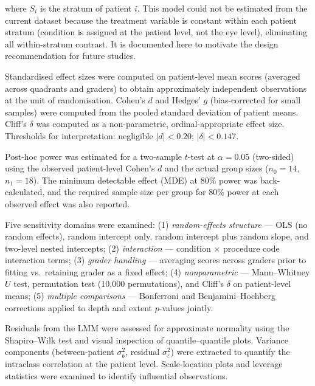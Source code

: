 \noindent where $S_i$ is the stratum of patient $i$. This model could not be estimated from the current dataset because the treatment variable is constant within each patient stratum (condition is assigned at the patient level, not the eye level), eliminating all within-stratum contrast. It is documented here to motivate the design recommendation for future studies.


Standardised effect sizes were computed on patient-level mean scores (averaged across quadrants and graders) to obtain approximately independent observations at the unit of randomisation. Cohen's $d$ and Hedges' $g$ (bias-corrected for small samples) were computed from the pooled standard deviation of patient means. Cliff's $\delta$ was computed as a non-parametric, ordinal-appropriate effect size. Thresholds for interpretation: negligible $|d| < 0.20$; $|\delta| < 0.147$.

Post-hoc power was estimated for a two-sample $t$-test at $\alpha = 0.05$ (two-sided) using the observed patient-level Cohen's $d$ and the actual group sizes ($n_0 = 14$, $n_1 = 18$). The minimum detectable effect (MDE) at 80\% power was back-calculated, and the required sample size per group for 80\% power at each observed effect was also reported.

Five sensitivity domains were examined: (1) \textit{random-effects structure} --- OLS (no random effects), random intercept only, random intercept plus random slope, and two-level nested intercepts; (2) \textit{interaction} --- condition $\times$ procedure code interaction terms; (3) \textit{grader handling} --- averaging scores across graders prior to fitting vs.\ retaining grader as a fixed effect; (4) \textit{nonparametric} --- Mann--Whitney $U$ test, permutation test (10{,}000 permutations), and Cliff's $\delta$ on patient-level means; (5) \textit{multiple comparisons} --- Bonferroni and Benjamini--Hochberg corrections applied to depth and extent $p$-values jointly.

Residuals from the LMM were assessed for approximate normality using the Shapiro--Wilk test and visual inspection of quantile--quantile plots. Variance components (between-patient $\sigma^2_b$, residual $\sigma^2_\varepsilon$) were extracted to quantify the intraclass correlation at the patient level. Scale-location plots and leverage statistics were examined to identify influential observations.

